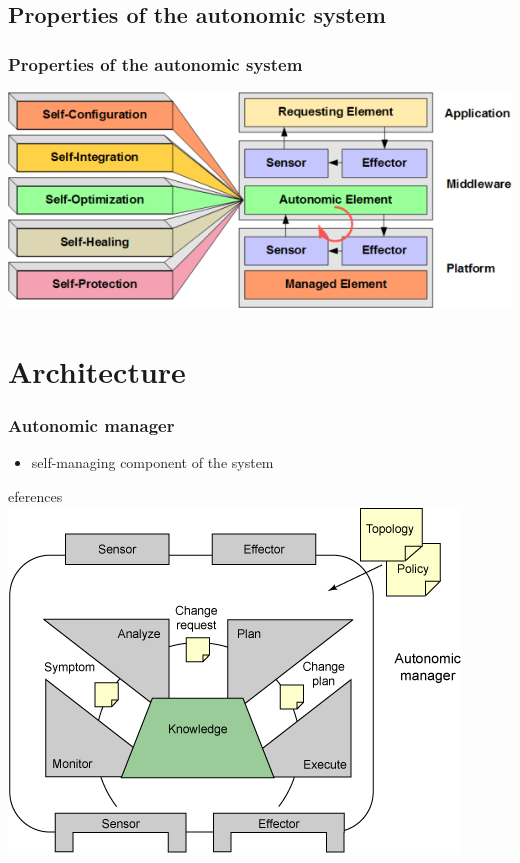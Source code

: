 \documentclass[11pt]{beamer}
\begin{document}
    \subsection{Properties of the autonomic system}
	\begin{frame}
		\frametitle{Properties of the autonomic system}
		\begin{center}
        \includegraphics[scale=0.7]{propertiesAutonomicComputing.png}
		\end{center}
    \end{frame}

    \section{Architecture}
\begin{frame}
\frametitle{Autonomic manager}
\begin{itemize}
\item self-managing component of the system
\end{itemize}
\begin{center}
eferences\includegraphics[scale=0.5]{autonomic-manager.png}
\end{center}
\end{frame}
\end{document}
